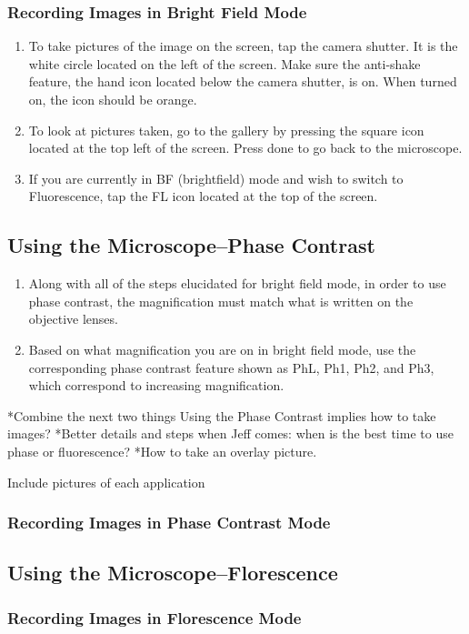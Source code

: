 \documentclass{article}
\begin{document}
\subsubsection{Recording Images in Bright Field Mode}

\begin{enumerate}
  \item To take pictures of the image on the screen, tap the camera shutter. It is the white circle located on the left of the screen. Make sure the anti-shake feature, the hand icon located below the camera shutter, is on. When turned on, the icon should be orange.
  \item To look at pictures taken, go to the gallery by pressing the square icon located at the top left of the screen. Press done to go back to the microscope. 
  \item If you are currently in BF (brightfield) mode and wish to switch to Fluorescence, tap the FL icon located at the top of the screen.  
\end{enumerate}


\subsection{Using the Microscope--Phase Contrast}
\begin{enumerate}
  \item Along with all of the steps elucidated for bright field mode, in order to use phase contrast, the magnification must match what is written on the objective lenses.
  \item Based on what magnification you are on in bright field mode, use the corresponding phase contrast feature shown as PhL, Ph1, Ph2, and Ph3, which correspond to increasing magnification. 
\end{enumerate}

*Combine the next two things Using the Phase Contrast implies how to take images?
*Better details and steps when Jeff comes: when is the best time to use phase or fluorescence? 
*How to take an overlay picture.

Include pictures of each application 
\subsubsection{Recording Images in Phase Contrast Mode}



\subsection{Using the Microscope--Florescence}



\subsubsection{Recording Images in Florescence Mode}
\end{document}
